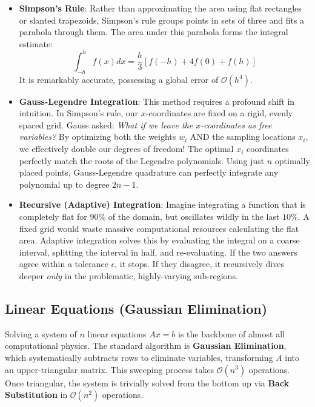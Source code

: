 \documentclass[12pt, a4paper]{article}
\begin{document}
\begin{itemize}
    \item \textbf{Simpson's Rule}: Rather than approximating the area using flat rectangles or slanted trapezoids, Simpson's rule groups points in sets of three and fits a parabola through them. The area under this parabola forms the integral estimate:
    \begin{equation}
    \int_{-h}^{h} f(x)dx = \frac{h}{3} [f(-h) + 4f(0) + f(h)]
    \end{equation}
    It is remarkably accurate, possessing a global error of $\mathcal{O}(h^4)$.
    
    \item \textbf{Gauss-Legendre Integration}: This method requires a profound shift in intuition. In Simpson's rule, our $x$-coordinates are fixed on a rigid, evenly spaced grid. Gauss asked: \textit{What if we leave the $x$-coordinates as free variables?} By optimizing both the weights $w_i$ AND the sampling locations $x_i$, we effectively double our degrees of freedom! 
    The optimal $x_i$ coordinates perfectly match the roots of the Legendre polynomials. Using just $n$ optimally placed points, Gauss-Legendre quadrature can perfectly integrate any polynomial up to degree $2n-1$.
    
    \item \textbf{Recursive (Adaptive) Integration}: Imagine integrating a function that is completely flat for $90\%$ of the domain, but oscillates wildly in the last $10\%$. A fixed grid would waste massive computational resources calculating the flat area. Adaptive integration solves this by evaluating the integral on a coarse interval, splitting the interval in half, and re-evaluating. If the two answers agree within a tolerance $\epsilon$, it stops. If they disagree, it recursively dives deeper \textit{only} in the problematic, highly-varying sub-regions.
\end{itemize}

\subsection{Linear Equations (Gaussian Elimination)}
\label{subsec:lineareq}
Solving a system of $n$ linear equations $Ax = b$ is the backbone of almost all computational physics.
The standard algorithm is \textbf{Gaussian Elimination}, which systematically subtracts rows to eliminate variables, transforming $A$ into an upper-triangular matrix.
This sweeping process takes $\mathcal{O}(n^3)$ operations. Once triangular, the system is trivially solved from the bottom up via \textbf{Back Substitution} in $\mathcal{O}(n^2)$ operations.
\end{document}
